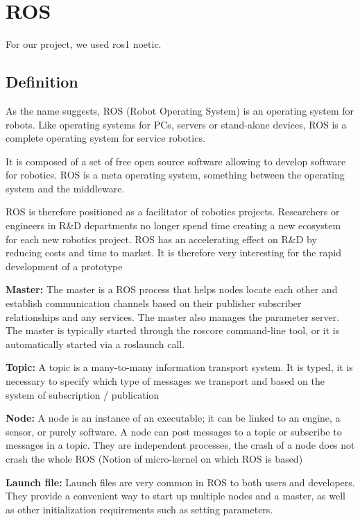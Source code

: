 \section{ROS}\insertloftspace
\setcounter{figure}{0}\setcounter{table}{0}

For our project, we used ros1 noetic.

\subsection{Definition}

As the name suggests, ROS (Robot Operating System) is an operating system for robots. Like operating systems for PCs, servers or stand-alone devices, ROS is a complete operating system for service robotics.

\bigbreak
It is composed of a set of free open source software allowing to develop software for robotics. ROS is a meta operating system, something between the operating system and the middleware.

\bigbreak
ROS is therefore positioned as a facilitator of robotics projects. Researchers or engineers in R\&D departments no longer spend time creating a new ecosystem for each new robotics project. ROS has an accelerating effect on R\&D by reducing costs and time to market. It is therefore very interesting for the rapid development of a prototype

\bigbreak
\textbf{Master:} The master is a ROS process that helps nodes locate each other and establish communication channels based on their publisher subscriber relationships and any services. The master also manages the parameter server. The master is typically started through the roscore command-line tool, or it is automatically started via a roslaunch call.

\bigbreak
\textbf{Topic:} A topic is a many-to-many information transport system. It is typed, it is necessary to specify which type of messages we transport and based on the system of subscription / publication 

\bigbreak
\textbf{Node:} A node is an instance of an executable; it can be linked to an engine, a sensor, or purely software. A node can post messages to a topic or subscribe to messages in a topic. They are independent processes, the crash of a node does not crash the whole ROS (Notion of micro-kernel on which ROS is based)

\bigbreak
\textbf{Launch file:} Launch files are very common in ROS to both users and developers. They provide a convenient way to start up multiple nodes and a master, as well as other initialization requirements such as setting parameters.

